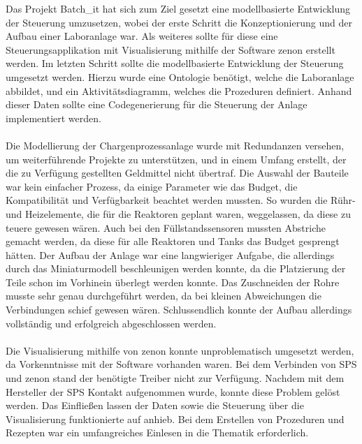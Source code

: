 Das Projekt Batch\_it hat sich zum Ziel gesetzt eine modellbasierte Entwicklung der Steuerung umzusetzen, wobei der erste Schritt die Konzeptionierung und der Aufbau einer Laboranlage war. Als weiteres sollte für diese eine Steuerungsapplikation mit Visualisierung mithilfe der Software zenon erstellt werden. Im letzten Schritt sollte die modellbasierte Entwicklung der Steuerung umgesetzt werden. Hierzu wurde eine Ontologie benötigt, welche die Laboranlage abbildet, und ein Aktivitätsdiagramm, welches die Prozeduren definiert. Anhand dieser Daten sollte eine Codegenerierung für die Steuerung der Anlage implementiert werden. \\\\
Die Modellierung der Chargenprozessanlage wurde mit Redundanzen versehen, um weiterführende Projekte zu unterstützen, und in einem Umfang erstellt, der die zu Verfügung gestellten Geldmittel nicht übertraf. 
Die Auswahl der Bauteile war kein einfacher Prozess, da einige Parameter wie das Budget, die Kompatibilität und Verfügbarkeit beachtet werden mussten. So wurden die Rühr- und Heizelemente, die für die Reaktoren geplant waren, weggelassen, da diese zu teuere gewesen wären. Auch bei den Füllstandssensoren mussten Abstriche gemacht werden, da diese für alle Reaktoren und Tanks das Budget gesprengt hätten.
Der Aufbau der Anlage war eine langwieriger Aufgabe, die allerdings durch das Miniaturmodell beschleunigen werden konnte, da die Platzierung der Teile schon im Vorhinein überlegt werden konnte. Das Zuschneiden der Rohre musste sehr genau durchgeführt werden, da bei kleinen Abweichungen die Verbindungen schief gewesen wären. Schlussendlich konnte der Aufbau allerdings vollständig und erfolgreich abgeschlossen werden. \\\\
Die Visualisierung mithilfe von zenon konnte unproblematisch umgesetzt werden, da Vorkenntnisse mit der Software vorhanden waren. Bei dem Verbinden von \ac{SPS} und zenon stand der benötigte Treiber nicht zur Verfügung. Nachdem mit dem Hersteller der \ac{SPS} Kontakt aufgenommen wurde, konnte diese Problem gelöst werden. Das Einfließen lassen der Daten sowie die Steuerung über die Visualisierung funktionierte auf anhieb. Bei dem Erstellen von Prozeduren und Rezepten war ein umfangreiches Einlesen in die Thematik erforderlich.\\\\
